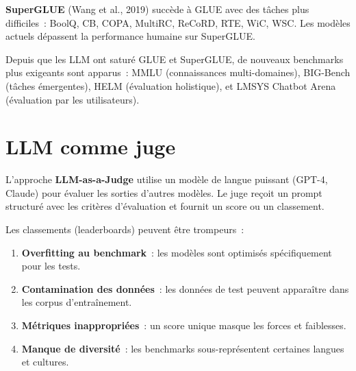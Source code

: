 \begin{definition}[SuperGLUE]
\textbf{SuperGLUE} (Wang et al., 2019) succ\`ede \`a GLUE avec des
t\^aches plus difficiles~: BoolQ, CB, COPA, MultiRC, ReCoRD, RTE, WiC,
WSC. Les mod\`eles actuels d\'epassent la performance humaine sur
SuperGLUE.
\end{definition}

\begin{remarque}
Depuis que les LLM ont satur\'e GLUE et SuperGLUE, de nouveaux
benchmarks plus exigeants sont apparus~: MMLU (connaissances
multi-domaines), BIG-Bench (t\^aches \'emergentes), HELM (\'evaluation
holistique), et LMSYS Chatbot Arena (\'evaluation par les utilisateurs).
\end{remarque}

\section{LLM comme juge}
\label{sec:eval:llm_judge}

\begin{definition}
L'approche \textbf{LLM-as-a-Judge} utilise un mod\`ele de langue puissant
(GPT-4, Claude) pour \'evaluer les sorties d'autres mod\`eles. Le juge
re\c{c}oit un prompt structur\'e avec les crit\`eres d'\'evaluation et
fournit un score ou un classement.
\end{definition}

\begin{attention}[title=\textbf{Pi\`eges des classements}]
Les classements (leaderboards) peuvent \^etre trompeurs~:
\begin{enumerate}
    \item \textbf{Overfitting au benchmark}~: les mod\`eles sont optimis\'es
    sp\'ecifiquement pour les tests.
    \item \textbf{Contamination des donn\'ees}~: les donn\'ees de test
    peuvent appara\^itre dans les corpus d'entra\^inement.
    \item \textbf{M\'etriques inappropri\'ees}~: un score unique masque
    les forces et faiblesses.
    \item \textbf{Manque de diversit\'e}~: les benchmarks sous-repr\'esentent
    certaines langues et cultures.
\end{enumerate}
\end{attention}

